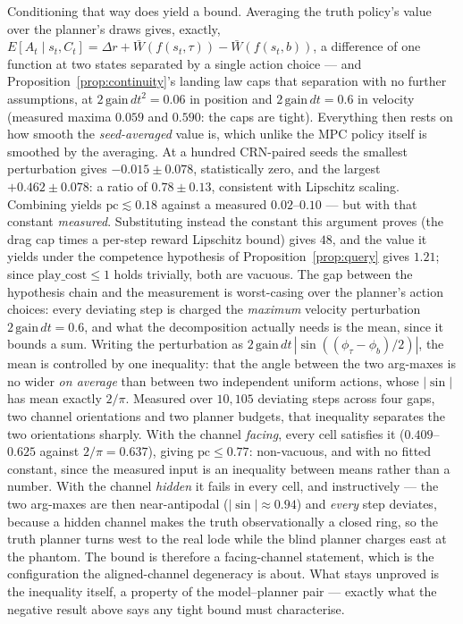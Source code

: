 \documentclass[11pt]{article}
\theoremstyle{remark}
\begin{document}
Conditioning that way does yield a bound. Averaging the truth policy's
value over the planner's draws gives, exactly, $E[A_t \mid s_t, C_t] =
\Delta r + \bar W(f(s_t,\tau)) - \bar W(f(s_t,b))$, a difference of one
function at two states separated by a single action choice --- and
Proposition~\ref{prop:continuity}'s landing law caps that separation
with no further assumptions, at $2\,\mathrm{gain}\,dt^2 = 0.06$ in
position and $2\,\mathrm{gain}\,dt = 0.6$ in velocity (measured maxima
$0.059$ and $0.590$: the caps are tight). Everything then rests on how
smooth the \emph{seed-averaged} value is, which unlike the MPC policy
itself is smoothed by the averaging. At a hundred CRN-paired seeds the smallest
perturbation gives $-0.015 \pm 0.078$, statistically zero, and the
largest $+0.462 \pm 0.078$: a ratio of $0.78 \pm 0.13$, consistent with
Lipschitz scaling. Combining yields $\mathrm{pc} \lesssim 0.18$ against
a measured $0.02$--$0.10$ --- but with that constant \emph{measured}.
Substituting instead the constant this argument proves (the drag cap
times a per-step reward Lipschitz bound) gives $48$, and the value it
yields under the competence hypothesis of
Proposition~\ref{prop:query} gives $1.21$; since
$\mathrm{play\_cost} \le 1$ holds trivially, both are vacuous. The
gap between the hypothesis chain and the measurement is worst-casing over
the planner's action choices: every deviating step is charged the
\emph{maximum} velocity perturbation $2\,\mathrm{gain}\,dt = 0.6$, and
what the decomposition actually needs is the mean, since it bounds a sum.
Writing the perturbation as
$2\,\mathrm{gain}\,dt\,|\sin((\phi_\tau - \phi_b)/2)|$, the mean is
controlled by one inequality: that the angle between the two arg-maxes is
no wider \emph{on average} than between two independent uniform actions,
whose $|\sin|$ has mean exactly $2/\pi$. Measured over $10{,}105$
deviating steps across four gaps, two channel orientations and two
planner budgets, that inequality separates the two orientations sharply.
With the channel \emph{facing}, every cell satisfies it
($0.409$--$0.625$ against $2/\pi = 0.637$), giving
$\mathrm{pc} \le 0.77$: non-vacuous, and with no fitted constant, since
the measured input is an inequality between means rather than a number.
With the channel \emph{hidden} it fails in every cell, and instructively
--- the two arg-maxes are then near-antipodal ($|\sin| \approx 0.94$)
and \emph{every} step deviates, because a hidden channel makes the truth
observationally a closed ring, so the truth planner turns west to the
real lode while the blind planner charges east at the phantom. The bound
is therefore a facing-channel statement, which is the configuration the
aligned-channel degeneracy is about. What stays unproved is the
inequality itself, a property of the model--planner pair --- exactly what
the negative result above says any tight bound must characterise.
\end{document}
